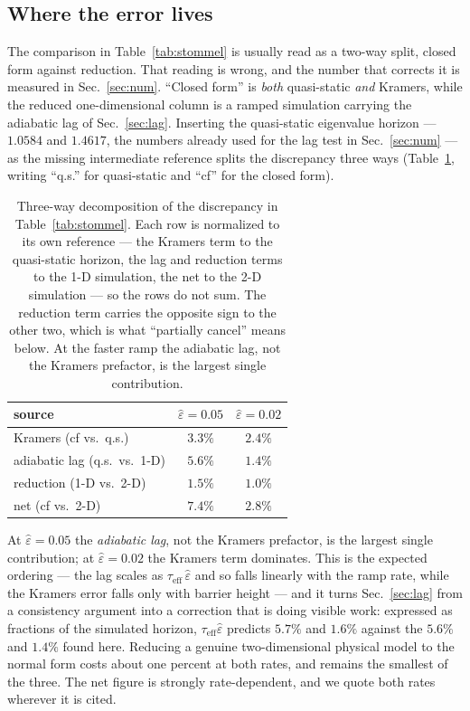 \documentclass[%
 aip,
 cha,
 amsmath,amssymb,
 reprint,
 superscriptaddress,
 floatfix,
]{revtex4-2}
\newcommand{\Sig}{\hat\varepsilon}
\begin{document}
\subsection{Where the error lives}

The comparison in Table~\ref{tab:stommel} is usually read as a two-way split, closed form against reduction.  That reading is wrong, and the number that corrects it is measured in Sec.~\ref{sec:num}.  ``Closed form'' is \emph{both} quasi-static \emph{and} Kramers, while the reduced one-dimensional column is a ramped simulation carrying the adiabatic lag of Sec.~\ref{sec:lag}.  Inserting the quasi-static eigenvalue horizon --- $1.0584$ and $1.4617$, the numbers already used for the lag test in Sec.~\ref{sec:num} --- as the missing intermediate reference splits the discrepancy three ways (Table~\ref{tab:errorsplit}, writing ``q.s.'' for quasi-static and ``cf'' for the closed form).
\begin{table}[b]
\caption{\label{tab:errorsplit}%
Three-way decomposition of the discrepancy in Table~\ref{tab:stommel}.  Each row is normalized to its own reference --- the Kramers term to the quasi-static horizon, the lag and reduction terms to the 1-D simulation, the net to the 2-D simulation --- so the rows do not sum.  The reduction term carries the opposite sign to the other two, which is what ``partially cancel'' means below.  At the faster ramp the adiabatic lag, not the Kramers prefactor, is the largest single contribution.}
\begin{ruledtabular}
\begin{tabular}{lcc}
\hline
source & $\Sig=0.05$ & $\Sig=0.02$ \\
\hline
Kramers (cf vs.\ q.s.)   & $3.3\%$ & $2.4\%$ \\
adiabatic lag (q.s.\ vs.\ 1-D) & $5.6\%$ & $1.4\%$ \\
reduction (1-D vs.\ 2-D) & $1.5\%$ & $1.0\%$ \\
\hline
net (cf vs.\ 2-D)        & $7.4\%$ & $2.8\%$ \\
\end{tabular}
\end{ruledtabular}
\end{table}
At $\Sig=0.05$ the \emph{adiabatic lag}, not the Kramers prefactor, is the largest single contribution; at $\Sig=0.02$ the Kramers term dominates.  This is the expected ordering --- the lag scales as $\tau_{\mathrm{eff}}\,\Sig$ and so falls linearly with the ramp rate, while the Kramers error falls only with barrier height --- and it turns Sec.~\ref{sec:lag} from a consistency argument into a correction that is doing visible work: expressed as fractions of the simulated horizon, $\tau_{\mathrm{eff}}\Sig$ predicts $5.7\%$ and $1.6\%$ against the $5.6\%$ and $1.4\%$ found here.  Reducing a genuine two-dimensional physical model to the normal form costs about one percent at both rates, and remains the smallest of the three.  The net figure is strongly rate-dependent, and we quote both rates wherever it is cited.
\end{document}
